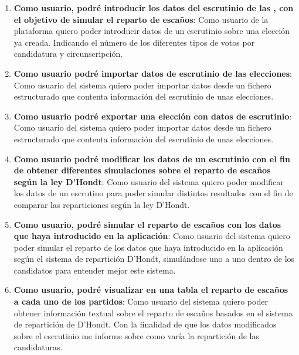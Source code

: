 \documentclass{article}
\begin{document}
\begin{enumerate}[label=HU-\arabic*]
            \item\label{itm:introducir-escrutinio} \textbf{\large Como usuario, podré introducir los datos del escrutinio de las , con el objetivo de simular el reparto de escaños}: Como usuario de la plataforma quiero poder introducir datos de un escrutinio sobre una elección ya creada. Indicando el número de los diferentes tipos de votos por candidatura y circunscripción.
            \item\label{itm:importar-escrutinio} \textbf{\large Como usuario podré importar datos de escrutinio de las elecciones}: Como usuario del sistema quiero poder importar datos desde un fichero estructurado que contenta información del escrutinio de unas elecciones.
            \item\label{itm:exportar-escrutinio} \textbf{\large Como usuario podré exportar una elección con datos de escrutinio}: Como usuario del sistema quiero poder importar datos desde un fichero estructurado que contenta información del escrutinio de unas elecciones.
            \item\label{itm:modificar-escrutinio} \textbf{\large Como usuario podré modificar los datos de un escrutinio con el fin de obtener diferentes simulaciones sobre el reparto de escaños según la ley D'Hondt}: Como usuario del sistema quiero poder modificar los datos de un escrutino para poder simular distintos resultados con el fin de comparar las reparticiones según la ley D'Hondt.
            \item\label{itm:visualizar-escanos} \textbf{\large Como usuario, podré simular el reparto de escaños con los datos que haya introducido en la aplicación}: Como usuario del sistema quiero poder simular el reparto de los datos que haya introducido en la aplicación según el sistema de repartición D'Hondt, simulándose uno a uno dentro de los candidatos para entender mejor este sistema.
            \item\label{itm:visualizar-tabla-escanos} \textbf{\large Como usuario, podré visualizar en una tabla el reparto de escaños a cada uno de los partidos}: Como usuario del sistema quiero poder obtener información textual sobre el reparto de escaños basados en el sistema de repartición de D'Hondt. Con la finalidad de que los datos modificados sobre el escrutinio me informe sobre como varía la repartición de las candidaturas.

\end{enumerate}
\end{document}
